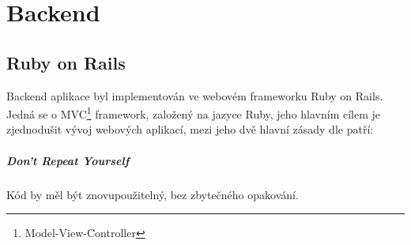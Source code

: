 \documentclass[twoside]{ctuthesis}
\begin{document}
%
%
%
% 	
%
%
% 	
%
%
%
% 	
%
%
% 	
%

\chapter{Backend}

\section{Ruby on Rails}

Backend aplikace byl implementován ve webovém frameworku Ruby on Rails. Jedná se o MVC\footnote{Model-View-Controller} framework, založený na jazyce Ruby, jeho hlavním cílem je zjednodušit vývoj webových aplikací, mezi jeho dvě hlavní zásady dle \cite{rails2020} patří:
\paragraph{Don't Repeat Yourself} Kód by měl být znovupoužitelný, bez zbytečného opakování.
\end{document}
